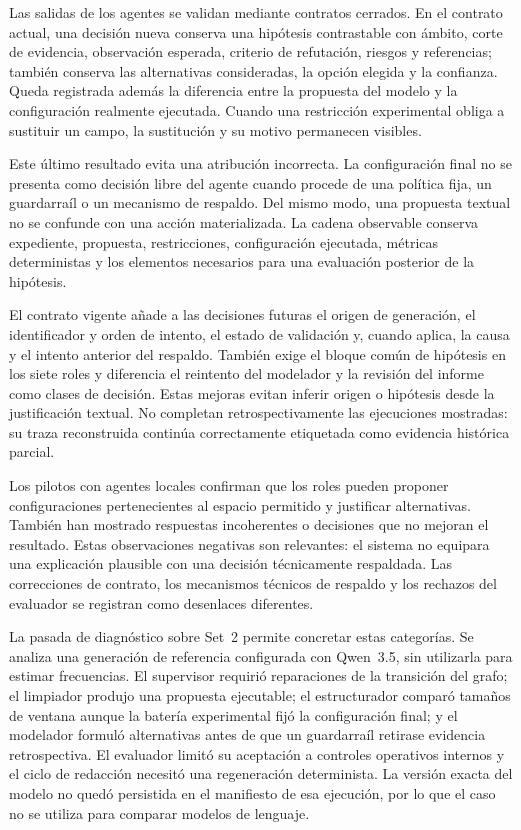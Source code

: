 Las salidas de los agentes se validan mediante contratos cerrados. En el
contrato actual, una decisión nueva conserva una hipótesis contrastable con
ámbito, corte de evidencia, observación esperada, criterio de refutación,
riesgos y referencias; también conserva las alternativas consideradas, la
opción elegida y la confianza. Queda registrada además la diferencia entre la
propuesta del modelo y la configuración realmente ejecutada. Cuando una
restricción experimental obliga a sustituir un campo, la sustitución y su
motivo permanecen visibles.

Este último resultado evita una atribución incorrecta. La configuración final
no se presenta como decisión libre del agente cuando procede de una política
fija, un guardarraíl o un mecanismo de respaldo. Del mismo modo, una propuesta textual no se
confunde con una acción materializada. La cadena observable conserva expediente,
propuesta, restricciones, configuración ejecutada, métricas deterministas y
los elementos necesarios para una evaluación posterior de la hipótesis.

El contrato vigente añade a las decisiones futuras el origen de generación,
el identificador y orden de intento, el estado de validación y, cuando aplica,
la causa y el intento anterior del respaldo. También exige el bloque común de
hipótesis en los siete roles y diferencia el reintento del modelador y la
revisión del informe como clases de decisión. Estas mejoras evitan inferir
origen o hipótesis desde la justificación textual. No completan
retrospectivamente las ejecuciones mostradas: su traza reconstruida continúa
correctamente etiquetada como evidencia histórica parcial.

Los pilotos con agentes locales confirman que los roles pueden proponer
configuraciones pertenecientes al espacio permitido y justificar alternativas.
También han mostrado respuestas incoherentes o decisiones que no mejoran el
resultado. Estas observaciones negativas son relevantes: el sistema no equipara
una explicación plausible con una decisión técnicamente respaldada. Las
correcciones de contrato, los mecanismos técnicos de respaldo y los rechazos del evaluador se
registran como desenlaces diferentes.

La pasada de diagnóstico sobre Set~2 permite concretar estas categorías. Se
analiza una generación de referencia configurada con Qwen~3.5, sin utilizarla
para estimar frecuencias. El supervisor requirió reparaciones de la transición
del grafo; el
limpiador produjo una propuesta ejecutable; el estructurador comparó tamaños de
ventana aunque la batería experimental fijó la configuración final; y el modelador formuló
alternativas antes de que un guardarraíl retirase evidencia retrospectiva. El
evaluador limitó su aceptación a controles operativos internos y el ciclo de
redacción necesitó una regeneración determinista. La versión exacta del modelo
no quedó persistida en el manifiesto de esa ejecución, por lo que el caso no se
utiliza para comparar modelos de lenguaje.

